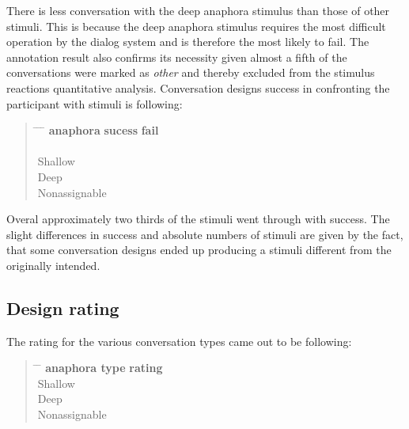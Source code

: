 There is less conversation with the deep anaphora stimulus than those of other stimuli.
This is because the deep anaphora stimulus requires the most difficult operation by the dialog system
and is therefore the most likely to fail.
The annotation result also confirms its necessity
given almost a fifth of the conversations were marked as \textit{other} and
thereby excluded from the stimulus reactions quantitative analysis.
Conversation designs success in confronting the participant with stimuli is following:

\begin{quote}
\begin{tabbing}
\hspace{4cm} \= \hspace{4cm} \=  \hspace{4cm} \= \kill %
        \textbf{anaphora} \> \textbf{sucess} \> \textbf{fail} \\
        {}   \\
        Shallow   \\
        Deep   \\
        Nonassignable   \\
    \end{tabbing}
    \end{quote}

Overal approximately two thirds of the stimuli went through with success.
The slight differences in success and absolute numbers of stimuli are given by the fact,
that some conversation designs ended up producing a stimuli different from the originally intended.


\subsection{Design rating}

The rating for the various conversation types came out to be following:

\begin{quote}
\begin{tabbing}
\hspace{4cm} \= \hspace{4cm} \= \kill %
\textbf{anaphora type} \> \textbf{rating} \\
Shallow  \\
Deep  \\
Nonassignable  \\
\end{tabbing}
\end{quote}

